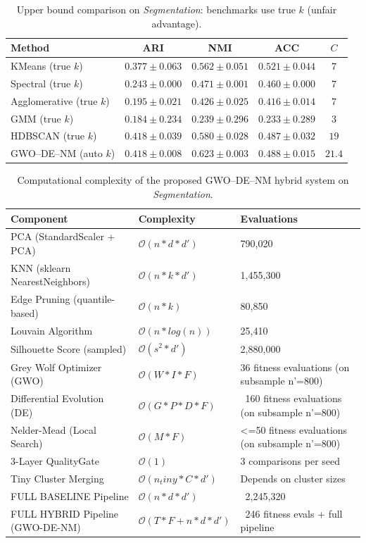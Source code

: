 \begin{table}[htbp]
\centering\small
\caption{Upper bound comparison on \textit{Segmentation}: benchmarks use true $k$ (unfair advantage).}
\label{tab:upper_segmentation}
\begin{tabular}{lcccc}
\toprule
Method & ARI & NMI & ACC & $C$ \\
\midrule
KMeans (true $k$) & $0.377 \pm 0.063$ & $0.562 \pm 0.051$ & $0.521 \pm 0.044$ & $7$ \\
Spectral (true $k$) & $0.243 \pm 0.000$ & $0.471 \pm 0.001$ & $0.460 \pm 0.000$ & $7$ \\
Agglomerative (true $k$) & $0.195 \pm 0.021$ & $0.426 \pm 0.025$ & $0.416 \pm 0.014$ & $7$ \\
GMM (true $k$) & $0.184 \pm 0.234$ & $0.239 \pm 0.296$ & $0.233 \pm 0.289$ & $3$ \\
HDBSCAN (true $k$) & $0.418 \pm 0.039$ & $0.580 \pm 0.028$ & $0.487 \pm 0.032$ & $19$ \\
\midrule
GWO--DE--NM (auto $k$) & $\mathbf{0.418 \pm 0.008}$ & $\mathbf{0.623 \pm 0.003}$ & $\mathbf{0.488 \pm 0.015}$ & $21.4$ \\
\bottomrule
\end{tabular}
\end{table}

\begin{table}[htbp]
\centering
\small
\caption{Computational complexity of the proposed GWO--DE--NM hybrid system on \textit{Segmentation}.}
\label{tab:complexity_segmentation}
\begin{tabular}{lll}
\toprule
Component & Complexity & Evaluations \\
\midrule
PCA (StandardScaler + PCA) & $\mathcal{O}(n * d * d')$ & 790,020 \\
KNN (sklearn NearestNeighbors) & $\mathcal{O}(n * k * d')$ & 1,455,300 \\
Edge Pruning (quantile-based) & $\mathcal{O}(n * k)$ & 80,850 \\
Louvain Algorithm & $\mathcal{O}(n * log(n))$ & 25,410 \\
Silhouette Score (sampled) & $\mathcal{O}(s^2 * d')$ & 2,880,000 \\
Grey Wolf Optimizer (GWO) & $\mathcal{O}(W * I * F)$ & 36 fitness evaluations (on subsample n'=800) \\
Differential Evolution (DE) & $\mathcal{O}(G * P * D * F)$ & ~160 fitness evaluations (on subsample n'=800) \\
Nelder-Mead (Local Search) & $\mathcal{O}(M * F)$ & <=50 fitness evaluations (on subsample n'=800) \\
3-Layer QualityGate & $\mathcal{O}(1)$ & 3 comparisons per seed \\
Tiny Cluster Merging & $\mathcal{O}(n_tiny * C * d')$ & Depends on cluster sizes \\
\midrule
FULL BASELINE Pipeline & $\mathcal{O}(n * d * d')$ & ~2,245,320 \\
\midrule
FULL HYBRID Pipeline (GWO-DE-NM) & $\mathcal{O}(T * F + n * d * d')$ & ~246 fitness evals + full pipeline \\
\bottomrule
\end{tabular}
\end{table}